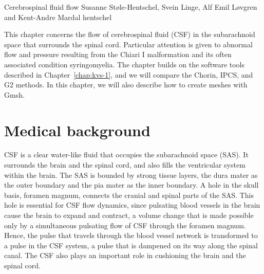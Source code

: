               {Cerebrospinal fluid flow}
              {Susanne St\o le-Hentschel, Svein Linge, Alf Emil L{\o}vgren and Kent-Andre Mardal}
              {hentschel}

This chapter concerns the flow of cerebrospinal fluid (CSF) in the
subarachnoid space that surrounds the spinal cord. Particular
attention is given to abnormal flow and pressure resulting from the
Chiari I malformation and its often associated condition
syringomyelia.  The chapter builds on the software tools described in
Chapter~\ref{chap:kvs-1}, and we will compare the Chorin, IPCS, and G2
methods.  In this chapter, we will also describe how to create meshes
with Gmsh.

\section{Medical background}

CSF is a clear water-like fluid that occupies the subarachnoid
space (SAS).  It surrounds the brain and the spinal cord, and also
fills the ventricular system within the brain. The SAS is bounded by
strong tissue layers, the dura mater as the outer boundary and the pia
mater as the inner boundary. A hole in the skull basis, foramen
magnum, connects the cranial and spinal parts of
the SAS. This hole is essential for CSF flow dynamics, since pulsating
blood vessels in the brain cause the brain to expand and contract, a
volume change that is made possible only by a simultaneous pulsating
flow of CSF through the foramen magnum. Hence, the pulse that travels
through the blood vessel network is transformed to a pulse in the CSF
system, a pulse that is dampened on its way along the spinal
canal. The CSF also plays an important role in cushioning the brain
and the spinal cord.

